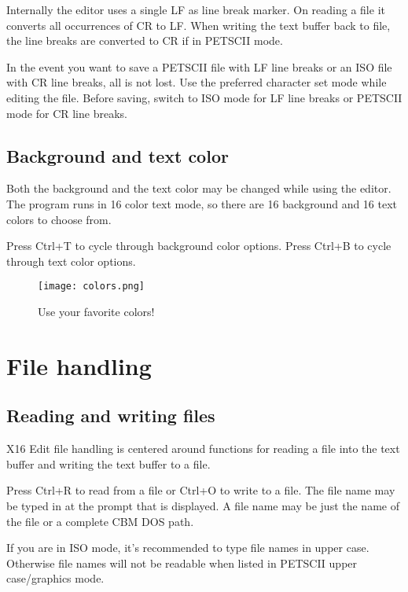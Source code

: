 \documentclass{article}
\begin{document}
        Internally the editor uses a single LF as line break marker. On reading a file it converts
        all occurrences of CR to LF. When writing the text buffer back to file, the line breaks
        are converted to CR if in PETSCII mode.

        In the event you want to save a PETSCII file with LF line breaks or an ISO file with
        CR line breaks, all is not lost. Use the preferred character set mode while
        editing the file. Before saving, switch to ISO mode for LF line breaks or PETSCII mode
        for CR line breaks.

    \subsection{Background and text color}

        Both the background and the text color may be changed while using the editor. The program
        runs in 16 color text mode, so there are 16 background and 16 text colors to choose from.

        Press Ctrl+T to cycle through background color options.
        Press Ctrl+B to cycle through text color options.

        \begin{figure}[H]
            \caption{Use your favorite colors!}
            \centering\texttt{[image: colors.png]}
        \end{figure}
       
\section{File handling}

    \subsection{Reading and writing files}

    X16 Edit file handling is centered around functions for reading a file into the text buffer and writing
    the text buffer to a file.

    Press Ctrl+R to read from a file or Ctrl+O to write to a file. The file name may 
    be typed in at the prompt that is displayed. A file name may 
    be just the name of the file or a complete CBM DOS path.

    If you are in ISO mode, it's recommended to type file names in upper case. Otherwise file names will not
    be readable when listed in PETSCII upper case/graphics mode.
\end{document}
